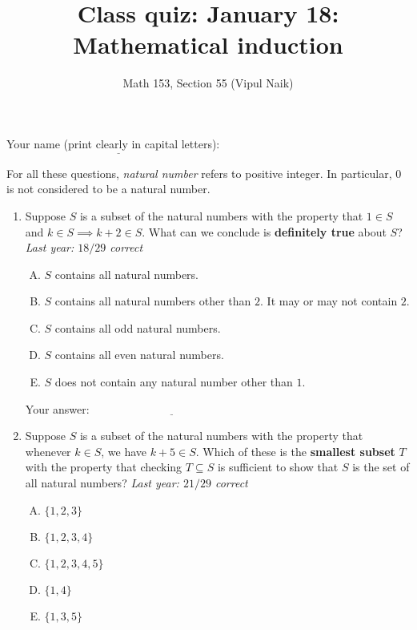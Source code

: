 \documentclass[10pt]{amsart}
\title{Class quiz: January 18: Mathematical induction}
\author{Math 153, Section 55 (Vipul Naik)}
\begin{document}
\maketitle

Your name (print clearly in capital letters): $\underline{\qquad\qquad\qquad\qquad\qquad\qquad\qquad\qquad\qquad\qquad}$

For all these questions, {\em natural number} refers to positive
integer. In particular, $0$ is not considered to be a natural number.
\begin{enumerate}
\item Suppose $S$ is a subset of the natural numbers with the property
  that $1 \in S$ and $k \in S \implies k + 2 \in S$. What can we
  conclude is {\bf definitely true} about $S$? {\em Last year: $18/29$
  correct}

  \begin{enumerate}[(A)]
  \item $S$ contains all natural numbers.
  \item $S$ contains all natural numbers other than $2$. It may or may
    not contain $2$.
  \item $S$ contains all odd natural numbers.
  \item $S$ contains all even natural numbers.
  \item $S$ does not contain any natural number other than $1$.
  \end{enumerate}

  \vspace{0.1in}
  Your answer: $\underline{\qquad\qquad\qquad\qquad\qquad\qquad\qquad}$
  \vspace{0.2in}

\item Suppose $S$ is a subset of the natural numbers with the property
  that whenever $k \in S$, we have $k + 5 \in S$. Which of these is
  the {\bf smallest subset} $T$ with the property that checking $T
  \subseteq S$ is sufficient to show that $S$ is the set of all
  natural numbers? {\em Last year: $21/29$ correct}

  \begin{enumerate}[(A)]
  \item $\{ 1,2,3 \}$
  \item $\{ 1,2,3,4 \}$
  \item $\{ 1,2,3,4,5 \}$
  \item $\{ 1,4 \}$
  \item $\{ 1,3,5 \}$
  \end{enumerate}


\end{enumerate}
\end{document}
